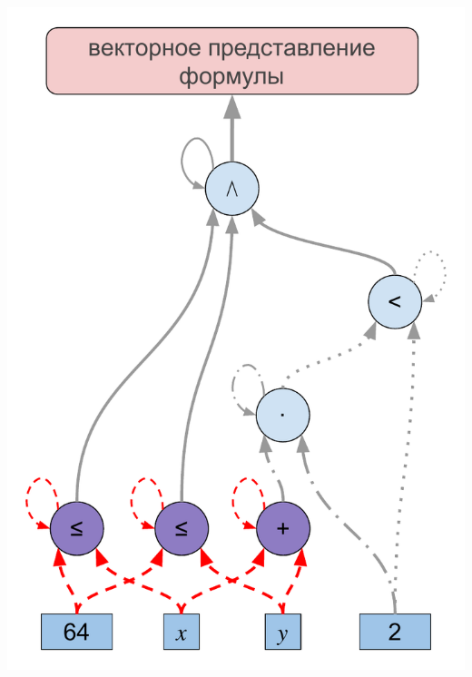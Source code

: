 \documentclass[14pt,aspectratio=169,hyperref={pdftex,unicode},xcolor=dvipsnames]{beamer}
\begin{document}
\begin{frame}[noframenumbering]

\begin{center}
  \includegraphics[scale=0.45]{./assets/formula-ast-talk-1.pdf}
\end{center}

\end{frame}
\end{document}

